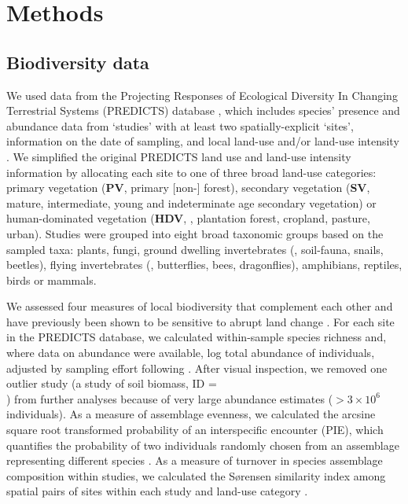 \section{Methods}
\label{C03_02}
\subsection{Biodiversity data} 
\label{C03_0201}
We used data from the Projecting Responses of Ecological Diversity In Changing Terrestrial Systems (PREDICTS) database \citep{Hudson2016}, which includes species’ presence and abundance data from ‘studies’ with at least two spatially-explicit ‘sites’, information on the date of sampling, and local land-use and/or land-use intensity \citep{Hudson2016}. We simplified the original PREDICTS land use and land-use intensity information \citep{Hudson2014,Hudson2016} by allocating each site to one of three broad land-use categories: primary vegetation (\textbf{PV}, \ie primary [non-] forest), secondary vegetation (\textbf{SV}, \ie mature, intermediate, young and indeterminate age secondary vegetation) or human-dominated vegetation (\textbf{HDV}, \ie, plantation forest, cropland, pasture, urban). Studies were grouped into eight broad taxonomic groups based on the sampled taxa: plants, fungi, ground dwelling invertebrates (\eg, soil-fauna, snails, beetles), flying invertebrates (\eg, butterflies, bees, dragonflies), amphibians, reptiles, birds or mammals. 

We assessed four measures of local biodiversity that complement each other and have previously been shown to be sensitive to abrupt land change \citep{Supp2014,Santini2016}. For each site in the PREDICTS database, we calculated within-sample species richness and, where data on abundance were available, log total abundance of individuals, adjusted by sampling effort following \cite{Newbold2014b}. After visual inspection, we removed one outlier study (a study of soil biomass, ID = \\ ) from further analyses because of very large abundance estimates ($> 3\times10^6$ individuals). As a measure of assemblage evenness, we calculated the arcsine square root transformed probability of an interspecific encounter (PIE), which quantifies the probability of two individuals randomly chosen from an assemblage representing different species \citep{Hurlbert1971}. As a measure of turnover in species assemblage composition within studies, we calculated the S\o rensen similarity index among spatial pairs of sites within each study and land-use category \citep{Magurran2004}.

